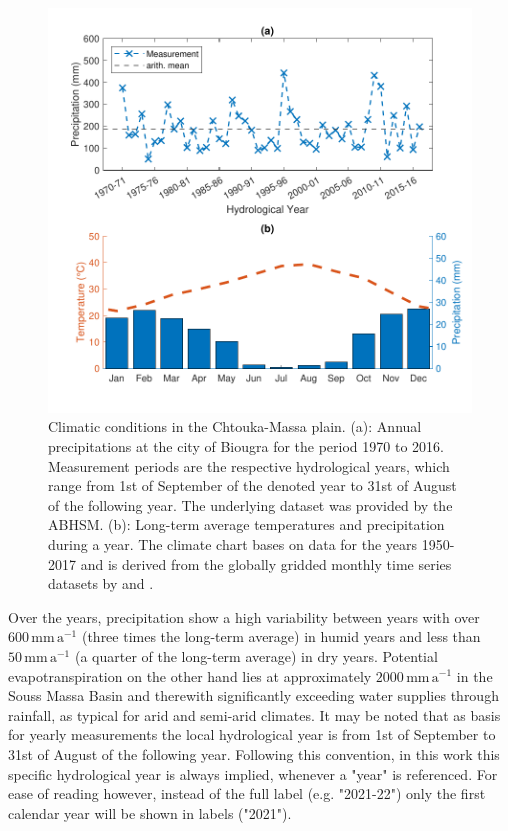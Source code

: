 \begin{figure}[p]
    \centering
    \includegraphics[width=1.0\textwidth]{./img/Fig-PrecNClimateChtouka.pdf}
    \captionsetup{format=hang, labelfont=bf, textfont=it}
    \caption{Climatic conditions in the Chtouka-Massa plain. (a): Annual precipitations at the city of Biougra for the period 1970 to 2016. Measurement periods are the respective hydrological years, which range from 1st of September of the denoted year to 31st of August of the following year. The underlying dataset was provided by the ABHSM. (b): Long-term average temperatures and precipitation during a year. The climate chart bases on data for the years 1950-2017 and is derived from the globally gridded monthly time series datasets by \textcite{Matsuura.2018T} and \textcite{Matsuura.2018P}.}
    \label{Fig-ClimateChart}
\end{figure}

Over the years, precipitation show a high variability between years with over $600 \, \textrm{mm} \, \textrm{a}^{-1}$ (three times the long-term average) in humid years and less than $50 \, \textrm{mm} \, \textrm{a}^{-1}$ (a quarter of the long-term average) in dry years. 
Potential evapotranspiration on the other hand lies at approximately $2000 \, \textrm{mm} \, \textrm{a}^{-1}$ in the Souss Massa Basin \parencite{Choukr.2017} and therewith significantly exceeding water supplies through rainfall, as typical for arid and semi-arid climates. 
It may be noted that as basis for yearly measurements the local hydrological year is from 1st of September to 31st of August of the following year. 
Following this convention, in this work this specific hydrological year is always implied, whenever a "year" is referenced. 
For ease of reading however, instead of the full label (e.g. "2021-22") only the first calendar year will be shown in labels ("2021").



